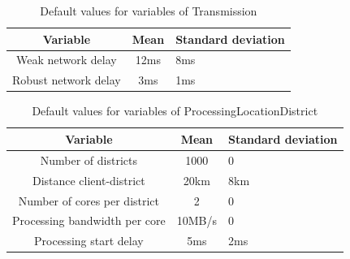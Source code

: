 \begin{table}[H]
\centering
\begin{tabular}{|c|c|l|}
\rowcolor{bluepoli!40} %
\hline
\textbf{Variable}      & \textbf{Mean}   & \textbf{Standard deviation}   \\ \hline \hline
Weak network delay     & 12ms            & 8ms                           \\ \hline
Robust network delay   & 3ms             & 1ms                           \\ \hline
\end{tabular}
\caption{Default values for variables of Transmission}
\label{tab:default_setting_transmission}
\end{table}

\begin{table}[H]
\centering
\begin{tabular}{|c|c|l|}
\rowcolor{bluepoli!40} %
\hline
\textbf{Variable}               & \textbf{Mean}   & \textbf{Standard deviation}   \\ \hline \hline
Number of districts             & 1000            & 0                             \\ \hline
Distance client-district        & 20km            & 8km                           \\ \hline
Number of cores per district    & 2               & 0                             \\ \hline
Processing bandwidth per core   & 10MB/s          & 0                             \\ \hline
Processing start delay          & 5ms             & 2ms                           \\ \hline
\end{tabular}
\caption{Default values for variables of ProcessingLocationDistrict}
\label{tab:default_setting_district}
\end{table}

